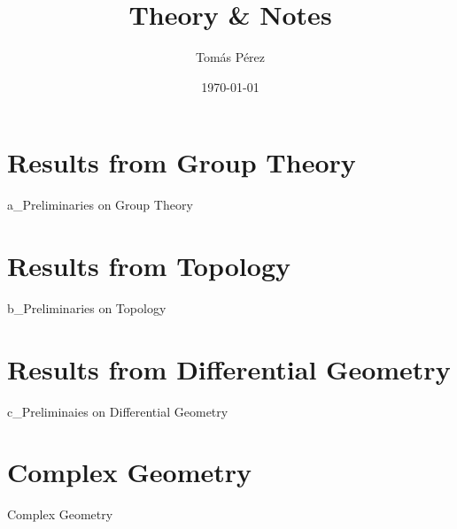 \documentclass{homework}
\author{Tomás Pérez}
\date{\today}
\title{Theory \& Notes}
\begin{document}
 \maketitle

\tableofcontents

\clearpage 
\section{{\textbf{Results from Group Theory}}}
{a_Preliminaries on Group Theory}
\clearpage

\section{{\textbf{Results from Topology}}}
{b_Preliminaries on Topology}
\clearpage

\section{{\textbf{Results from Differential Geometry}}}
{c_Preliminaies on Differential Geometry}
\clearpage

\section{{\textbf{Complex Geometry}}}
{Complex Geometry}

\iffalse
\section{{\textbf{Fibre Bundles}}}
{Fibre Bundles}
\fi

%
%
\end{document}
